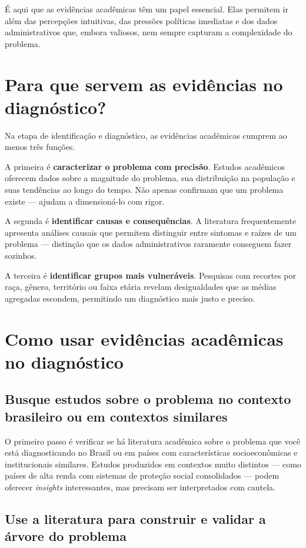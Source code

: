 \documentclass[12pt, a4paper, openany]{book}
\begin{document}
É aqui que as evidências acadêmicas têm um papel essencial. Elas permitem ir
além das percepções intuitivas, das pressões políticas imediatas e dos dados
administrativos que, embora valiosos, nem sempre capturam a complexidade do
problema.

\section{Para que servem as evidências no diagnóstico?}

Na etapa de identificação e diagnóstico, as evidências acadêmicas cumprem ao menos três funções.

A primeira é \textbf{caracterizar o problema com precisão}. Estudos acadêmicos oferecem dados sobre a magnitude do problema, sua distribuição na população e suas tendências ao longo do tempo. Não apenas confirmam que um problema existe --- ajudam a dimensioná-lo com rigor.

A segunda é \textbf{identificar causas e consequências}. A literatura frequentemente apresenta análises causais que permitem distinguir entre sintomas e raízes de um problema --- distinção que os dados administrativos raramente conseguem fazer sozinhos.

A terceira é \textbf{identificar grupos mais vulneráveis}. Pesquisas com recortes por raça, gênero, território ou faixa etária revelam desigualdades que as médias agregadas escondem, permitindo um diagnóstico mais justo e preciso.

\section{Como usar evidências acadêmicas no diagnóstico}

\subsection{Busque estudos sobre o problema no contexto brasileiro ou em
contextos similares}

O primeiro passo é verificar se há literatura acadêmica sobre o problema que
você está diagnosticando no Brasil ou em países com características
socioeconômicas e institucionais similares. Estudos produzidos em contextos
muito distintos --- como países de alta renda com sistemas de proteção social
consolidados --- podem oferecer \textit{insights} interessantes, mas precisam
ser interpretados com cautela.

\subsection{Use a literatura para construir e validar a árvore do problema}
\end{document}

